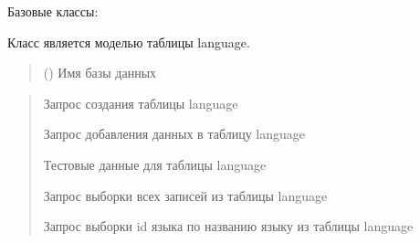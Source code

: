 \documentclass[letterpaper,10pt,russian]{sphinxmanual}
\begin{document}
\begin{fulllineitems}
\label{\detokenize{database.sqlite3_interface.tables:database.sqlite3_interface.tables.language.Language}}
\pysigstartsignatures
{}
\pysigstopsignatures
\sphinxAtStartPar
Базовые классы: {\hyperref[\detokenize{database.sqlite3_interface.tables:database.sqlite3_interface.tables.table.Table}]{}}

\sphinxAtStartPar
Класс является моделью таблицы language.
\begin{quote}\begin{description}
\sphinxAtStartPar
{} () \textendash{} Имя базы данных

\end{description}\end{quote}
\begin{description}
\begin{quote}\begin{description}
\sphinxAtStartPar
Запрос создания таблицы language

\sphinxAtStartPar
Запрос добавления данных в таблицу language

\sphinxAtStartPar
Тестовые данные для таблицы language

\sphinxAtStartPar
Запрос выборки всех записей из таблицы language

\sphinxAtStartPar
Запрос выборки id языка по названию языку из таблицы language

\end{description}\end{quote}

\begin{sphinxVerbatim}[commandchars=\\\{\}]
\end{sphinxVerbatim}


\end{description}
\end{fulllineitems}
\end{document}
